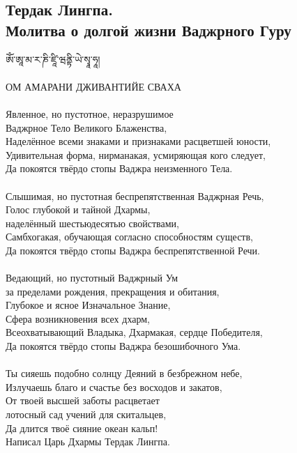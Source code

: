 \subsection{Тердак Лингпа. \\Молитва о долгой жизни Ваджрного Гуру}

\ti
ཨོཾ་ཨཱ་མ་ར་ཎི་ཛཱི་ཝནྟི་ཡེ་སྭཱ་ཧཱ། \\
\\
\ru ОМ АМАРАНИ ДЖИВАНТИЙЕ СВАХА\\
\\
Явленное, но пустотное, неразрушимое \\ \indent Ваджрное Тело Великого Блаженства,\\
Наделённое всеми знаками и признаками расцветшей юности,\\
Удивительная форма, нирманакая, усмиряющая кого следует,\\
Да покоятся твёрдо стопы Ваджра неизменного Тела.\\
\\
Слышимая, но пустотная беспрепятственная Ваджрная Речь,\\
Голос глубокой и тайной Дхармы, \\ \indent наделённый шестьюдесятью свойствами,\\
Самбхогакая, обучающая согласно способностям существ,\\
Да покоятся твёрдо стопы Ваджра беспрепятственной Речи.\\
\\
Ведающий, но пустотный Ваджрный Ум \\ \indent за пределами рождения, прекращения и обитания,\\
Глубокое и ясное Изначальное Знание, \\ \indent Сфера возникновения всех дхарм,\\
Всеохватывающий Владыка, Дхармакая, сердце Победителя,\\
Да покоятся твёрдо стопы Ваджра безошибочного Ума.\\
\\
Ты сияешь подобно солнцу Деяний в безбрежном небе,\\
Излучаешь благо и счастье без восходов и закатов,\\
От твоей высшей заботы расцветает \\ \indent лотосный сад учений для скитальцев,\\
Да длится твоё сияние океан кальп!\\
\scriptsize
Написал Царь Дхармы Тердак Лингпа.
\normalsize
\newpage

